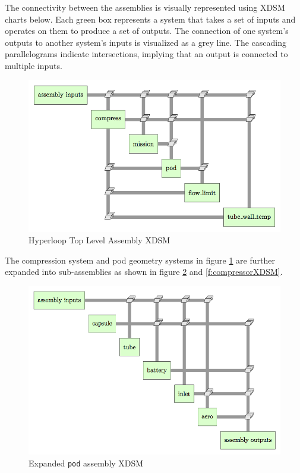 \documentclass[heading.tex]{subfiles}
\begin{document}
The connectivity between the assemblies is visually represented using XDSM charts below. Each green box represents a system that takes a
set of inputs and operates on them to produce a set of outputs. The connection of one system's outputs to another system's inputs is
visualized as a grey line. The cascading parallelograms indicate intersections, implying that an output is connected to multiple inputs. 


\begin{figure}[hbtp]
\centering
\includegraphics[width=\textwidth]{images/hyperloop_assembly_xdsm.png}
\caption{Hyperloop Top Level Assembly XDSM}
\label{f:hyperloopXDSM}
\end{figure}

The compression system and pod geometry systems in figure \ref{f:hyperloopXDSM} are further expanded into sub-assemblies as shown in figure \ref{f:podXDSM} and \ref{f:compressorXDSM}.

\begin{figure}[hbtp]
\centering
\includegraphics[width=\textwidth]{images/pod_assembly_xdsm.png}
\caption{Expanded \texttt{pod} assembly XDSM}
\label{f:podXDSM}
\end{figure}
\end{document}
